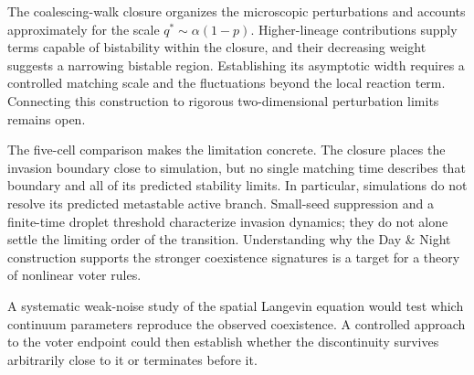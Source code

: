 The coalescing-walk closure organizes the microscopic perturbations and accounts
approximately for the scale $q^*\sim\alpha(1-p)$. Higher-lineage contributions supply
terms capable of bistability within the closure, and their decreasing weight suggests
a narrowing bistable region. Establishing its asymptotic width requires a controlled
matching scale and the fluctuations beyond the local reaction term. Connecting this
construction to rigorous two-dimensional perturbation limits~\cite{cox2010,cox2025}
remains open.

The five-cell comparison makes the limitation concrete. The closure places the invasion
boundary close to simulation, but no single matching time describes that boundary and
all of its predicted stability limits. In particular, simulations do not resolve its
predicted metastable active branch. Small-seed suppression and a finite-time droplet
threshold characterize invasion dynamics; they do not alone settle the limiting order
of the transition. Understanding why the Day \& Night construction supports the
stronger coexistence signatures is a target for a theory of nonlinear voter rules.

A systematic weak-noise study of the spatial Langevin equation would test which
continuum parameters reproduce the observed coexistence. A controlled approach to the
voter endpoint could then establish whether the discontinuity survives arbitrarily
close to it or terminates before it.
